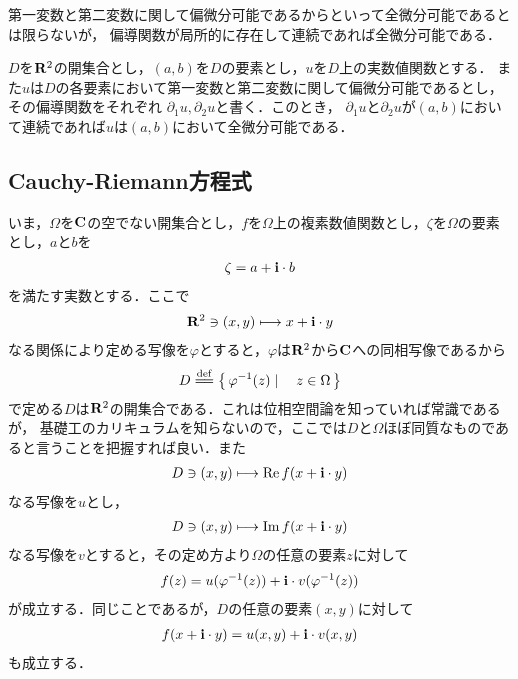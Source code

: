 	第一変数と第二変数に関して偏微分可能であるからといって全微分可能であるとは限らないが，
	偏導関数が局所的に存在して連続であれば全微分可能である．
	
	\begin{screen}
		\begin{thm}[偏導関数が連続であれば全微分可能]
		\label{thm:continuously_partially_differentiable_then_totally_differentiable}
			$D$を$\mathbf{R}^2$の開集合とし，$(a,b)$を$D$の要素とし，$u$を$D$上の実数値関数とする．
			また$u$は$D$の各要素において第一変数と第二変数に関して偏微分可能であるとし，その偏導関数をそれぞれ
			$\partial_1 u,\partial_2 u$と書く．このとき，
			$\partial_1 u$と$\partial_2 u$が$(a,b)$において連続であれば$u$は$(a,b)$において全微分可能である．
		\end{thm}
	\end{screen}
	
	\begin{sketch}
	\end{sketch}
	
\subsection{Cauchy-Riemann方程式}
	
	いま，$\Omega$を$\mathbf{C}$の空でない開集合とし，$f$を$\Omega$上の複素数値関数とし，$\zeta$を$\Omega$の要素とし，$a$と$b$を
	\begin{align}
		\zeta = a + \mathbf{i} \cdot b
	\end{align}
	を満たす実数とする．ここで
	\begin{align}
		\mathbf{R}^2 \ni (x,y) \longmapsto x + \mathbf{i} \cdot y
	\end{align}
	なる関係により定める写像を$\varphi$とすると，$\varphi$は$\mathbf{R}^2$から$\mathbf{C}$への同相写像であるから
	\begin{align}
		D \defeq \Set{\varphi^{-1}(z)}{z \in \Omega}
	\end{align}
	で定める$D$は$\mathbf{R}^2$の開集合である．これは位相空間論を知っていれば常識であるが，
	基礎工のカリキュラムを知らないので，ここでは$D$と$\Omega$ほぼ同質なものであると言うことを把握すれば良い．また
	\begin{align}
		D \ni (x,y) \longmapsto \operatorname{Re} f(x + \mathbf{i} \cdot y)
	\end{align}
	なる写像を$u$とし，
	\begin{align}
		D \ni (x,y) \longmapsto \operatorname{Im} f(x + \mathbf{i} \cdot y)
	\end{align}
	なる写像を$v$とすると，その定め方より$\Omega$の任意の要素$z$に対して
	\begin{align}
		f(z) = u(\varphi^{-1}(z)) + \mathbf{i} \cdot v(\varphi^{-1}(z))
	\end{align}
	が成立する．同じことであるが，$D$の任意の要素$(x,y)$に対して
	\begin{align}
		f(x + \mathbf{i} \cdot y) = u(x,y) + \mathbf{i} \cdot v(x,y)
	\end{align}
	も成立する．
	
